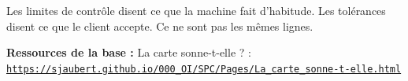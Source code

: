 \documentclass[10pt,a4paper]{article}
\begin{document}
\begin{tcolorbox}[retenir]Les limites de contrôle disent ce que la machine fait d'habitude. Les tolérances disent ce que le client accepte. Ce ne sont pas les mêmes lignes.\end{tcolorbox}
\vfill{\footnotesize\color{uimm}\textbf{Ressources de la base :} La carte sonne-t-elle ? : \href{https://sjaubert.github.io/000_OI/SPC/Pages/La_carte_sonne-t-elle.html}{\nolinkurl{https://sjaubert.github.io/000_OI/SPC/Pages/La_carte_sonne-t-elle.html}}}
\end{document}
